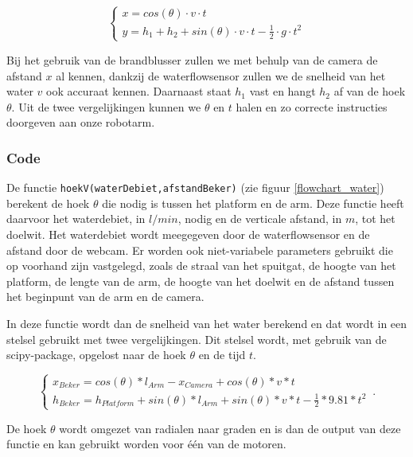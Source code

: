 \documentclass[kulak]{kulakarticle} %
\begin{document}
				\begin{equation}
					\begin{cases}
						x  = cos(\theta) \cdot v \cdot t \\
						y = h_1 + h_2 + sin(\theta) \cdot v \cdot t - \frac{1}{2} \cdot g \cdot t^2
					\end{cases}
				\end{equation}
				
			Bij het gebruik van de brandblusser zullen we met behulp van de camera de afstand \(x\) al kennen, dankzij de waterflowsensor zullen we de snelheid van het water \(v\) ook accuraat kennen.  Daarnaast staat \(h_1\) vast en hangt \(h_2\) af van de hoek \(\theta\). Uit de twee vergelijkingen kunnen we \(\theta\) en \(t\) halen en zo correcte instructies doorgeven aan onze robotarm.


		\subsubsection{Code}
		
			De functie \verb*|hoekV(waterDebiet,afstandBeker)| (zie figuur \ref{flowchart_water}) berekent de hoek \(\theta\)  die nodig is tussen het platform en de arm. Deze functie heeft daarvoor het waterdebiet, in \(l/min\), nodig en de verticale afstand, in \(m\), tot het doelwit. Het waterdebiet wordt meegegeven door de waterflowsensor en de afstand door de webcam. Er worden ook niet-variabele parameters gebruikt die op voorhand zijn vastgelegd, zoals de straal van het spuitgat, de hoogte van het platform, de lengte van de arm, de hoogte van het doelwit en de afstand tussen het beginpunt van de arm en de camera. 

			In deze functie wordt dan de snelheid van het water berekend en dat wordt in een stelsel gebruikt met twee vergelijkingen. Dit stelsel wordt, met gebruik van de scipy-package, opgelost naar de hoek \(\theta\) en de tijd \(t\).
			
				\begin{equation}
					\begin{cases}
						x_{Beker}  = cos(\theta )*l_{Arm} - x_{Camera} + cos(\theta )*v*t \\ 
						h_{Beker}  =  h_{Platform} + sin(\theta )*l_{Arm} + sin(\theta )*v*t - \frac{1}{2}*9.81*t^2
					\end{cases}\,.
				\end{equation}
				
			De hoek \(\theta\) wordt omgezet van radialen naar graden en is dan de output van deze functie en kan gebruikt worden voor één van de motoren.
\end{document}
